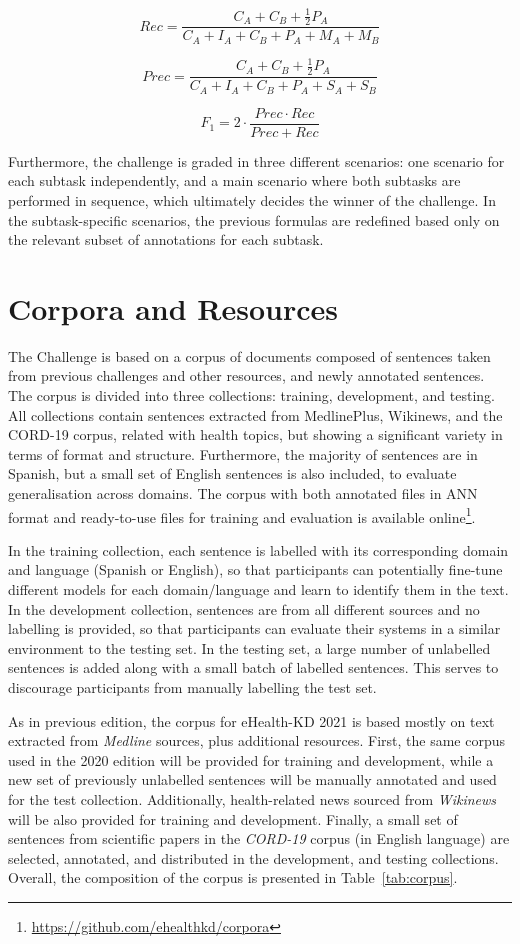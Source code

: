 \documentclass[a4paper,11pt,twocolumn,twoside]{article}
\begin{document}
$$Rec = \frac{C_A + C_B + \frac{1}{2} P_A}{C_A + I_A + C_B + P_A + M_A + M_B}$$

$$Prec = \frac{C_A + C_B + \frac{1}{2} P_A}{C_A + I_A + C_B + P_A + S_A + S_B}$$

$$F_1 = 2 \cdot \frac{Prec \cdot Rec}{Prec + Rec}$$

Furthermore, the challenge is graded in three different scenarios:
one scenario for each subtask independently, and a main scenario where both subtasks are performed in sequence, which ultimately decides the winner of the challenge.
In the subtask-specific scenarios, the previous formulas are redefined based only on the relevant subset of annotations for each subtask.


\section{Corpora and Resources}\label{sec:resources}

The Challenge is based on a corpus of documents composed of
sentences taken from previous challenges and other resources,
and newly annotated sentences.
The corpus is divided into three collections: training, development, and testing.
All collections contain sentences extracted from MedlinePlus, Wikinews, and the CORD-19 corpus, related with health topics, but showing a significant variety in terms of format and structure.
Furthermore, the majority of sentences are in Spanish, but a small set of English sentences is also included, to evaluate generalisation across domains.
The corpus with both annotated files in ANN format and ready-to-use files for training and evaluation is available online\footnote{\url{https://github.com/ehealthkd/corpora}}.

In the training collection, each sentence is labelled with its corresponding domain and language (Spanish or English), so that participants can potentially fine-tune different models for each domain/language and learn to identify them in the text.
In the development collection, sentences are from all different sources and no labelling is provided, so that participants can evaluate their systems in a similar environment to the testing set.
In the testing set, a large number of unlabelled sentences is added along with a small batch of labelled sentences. This serves to discourage participants from manually labelling the test set.

As in previous edition, the corpus for eHealth-KD 2021 is based mostly on text extracted from \textit{Medline} sources, plus additional resources.
First, the same corpus used in the 2020 edition will be provided for training and development, while a new set of previously unlabelled sentences will be manually annotated and used for the test collection. Additionally, health-related news sourced from \textit{Wikinews} will be also provided for training and development.
Finally, a small set of sentences from scientific papers in the \textit{CORD-19} corpus (in English language) are selected, annotated, and distributed in the development, and testing collections. Overall, the composition of the corpus is presented in Table~\ref{tab:corpus}.
\end{document}
